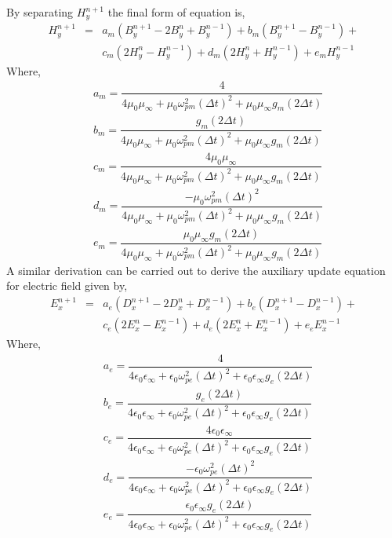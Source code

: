 By separating $H^{n+1}_y$ the final form of equation is,
\begin{eqnarray}
\nonumber H^{n+1}_y &=& a_m\left(B^{n+1}_y-2B^n_y+B^{n-1}_y\right)+b_m\left(B^{n+1}_y-B^{n-1}_y\right)+\\
&&c_m\left(2H^n_y-H^{n-1}_y\right)+d_m\left(2H^n_y+H^{n-1}_y\right)+e_m H^{n-1}_y
\label{2nd-order-B-H-final-form}
\end{eqnarray}
Where,
\begin{eqnarray}
\nonumber & a_m=\dfrac{4}{4\mu_0\mu_\infty+\mu_0\omega^2_{pm}\left(\Delta t\right)^2+\mu_0\mu_\infty g_m \left(2\Delta t\right)}\\
\nonumber & b_m=\dfrac{g_m\left(2\Delta t\right)}{4\mu_0\mu_\infty+\mu_0\omega^2_{pm}\left(\Delta t\right)^2+\mu_0\mu_\infty g_m \left(2\Delta t\right)}\\
\nonumber & c_m=\dfrac{4\mu_0\mu_\infty}{4\mu_0\mu_\infty+\mu_0\omega^2_{pm}\left(\Delta t\right)^2+\mu_0\mu_\infty g_m \left(2\Delta t\right)}\\
\nonumber & d_m=\dfrac{-\mu_0\omega^2_{pm}\left(\Delta t\right)^2}{4\mu_0\mu_\infty+\mu_0\omega^2_{pm}\left(\Delta t\right)^2+\mu_0\mu_\infty g_m \left(2\Delta t\right)}\\
\nonumber & e_m=\dfrac{\mu_0\mu_\infty g_m\left(2\Delta t\right)}{4\mu_0\mu_\infty+\mu_0\omega^2_{pm}\left(\Delta t\right)^2+\mu_0\mu_\infty g_m \left(2\Delta t\right)}
\label{1D-Drude-H-scalars}
\end{eqnarray}
A similar derivation can be carried out to derive the auxiliary update equation for electric field given by,
\begin{eqnarray}
\nonumber E^{n+1}_x &=& a_e\left(D^{n+1}_x-2D^n_x+D^{n-1}_x\right)+b_e\left(D^{n+1}_x-D^{n-1}_x\right)+\\
&&c_e\left(2E^n_x-E^{n-1}_x\right)+d_e\left(2E^n_x+E^{n-1}_x\right)+e_e E^{n-1}_x
\label{2nd-order-D-E-final-form}
\end{eqnarray}
Where,
\begin{eqnarray}
\nonumber & a_e=\dfrac{4}{4\epsilon_0\epsilon_\infty+\epsilon_0\omega^2_{pe}\left(\Delta t\right)^2+\epsilon_0\epsilon_\infty g_e \left(2\Delta t\right)}\\
\nonumber & b_e=\dfrac{g_e\left(2\Delta t\right)}{4\epsilon_0\epsilon_\infty+\epsilon_0\omega^2_{pe}\left(\Delta t\right)^2+\epsilon_0\epsilon_\infty g_e \left(2\Delta t\right)}\\
\nonumber & c_e=\dfrac{4\epsilon_0\epsilon_\infty}{4\epsilon_0\epsilon_\infty+\epsilon_0\omega^2_{pe}\left(\Delta t\right)^2+\epsilon_0\epsilon_\infty g_e \left(2\Delta t\right)}\\
\nonumber & d_e=\dfrac{-\epsilon_0\omega^2_{pe}\left(\Delta t\right)^2}{4\epsilon_0\epsilon_\infty+\epsilon_0\omega^2_{pe}\left(\Delta t\right)^2+\epsilon_0\epsilon_\infty g_e \left(2\Delta t\right)}\\
\nonumber & e_e=\dfrac{\epsilon_0\epsilon_\infty g_e\left(2\Delta t\right)}{4\epsilon_0\epsilon_\infty+\epsilon_0\omega^2_{pe}\left(\Delta t\right)^2+\epsilon_0\epsilon_\infty g_e \left(2\Delta t\right)}
\label{1D-Drude-E-scalars}
\end{eqnarray}

